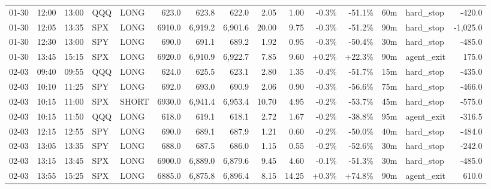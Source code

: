 \documentclass[11pt,a4paper,twoside]{article}
\begin{document}
\begin{landscape}
\begin{center}
\begin{longtable}{>{\color{txtmain}}l l l l l r r r r r r r r >{\color{txtmain}}l r}
01-30 & 12:00 & 13:00 & QQQ & LONG & 623.0 & 623.8 & 622.0 & 2.05 & 1.00 & \textcolor{lossred}{-0.3\%} & \textcolor{lossred}{-51.1\%} & 60m & hard\_stop & \textcolor{lossred}{-420.0} \\
01-30 & 12:05 & 13:35 & SPX & LONG & 6910.0 & 6,919.2 & 6,901.6 & 20.00 & 9.75 & \textcolor{lossred}{-0.3\%} & \textcolor{lossred}{-51.2\%} & 90m & hard\_stop & \textcolor{lossred}{-1,025.0} \\
01-30 & 12:30 & 13:00 & SPY & LONG & 690.0 & 691.1 & 689.2 & 1.92 & 0.95 & \textcolor{lossred}{-0.3\%} & \textcolor{lossred}{-50.4\%} & 30m & hard\_stop & \textcolor{lossred}{-485.0} \\
01-30 & 13:45 & 15:15 & SPX & LONG & 6920.0 & 6,910.9 & 6,922.7 & 7.85 & 9.60 & \textcolor{wingreen}{+0.2\%} & \textcolor{wingreen}{+22.3\%} & 90m & agent\_exit & \textcolor{wingreen}{175.0} \\
02-03 & 09:40 & 09:55 & QQQ & LONG & 624.0 & 625.5 & 623.1 & 2.80 & 1.35 & \textcolor{lossred}{-0.4\%} & \textcolor{lossred}{-51.7\%} & 15m & hard\_stop & \textcolor{lossred}{-435.0} \\
02-03 & 10:10 & 11:25 & SPY & LONG & 692.0 & 693.0 & 690.9 & 2.06 & 0.90 & \textcolor{lossred}{-0.3\%} & \textcolor{lossred}{-56.6\%} & 75m & hard\_stop & \textcolor{lossred}{-466.0} \\
02-03 & 10:15 & 11:00 & SPX & SHORT & 6930.0 & 6,941.4 & 6,953.4 & 10.70 & 4.95 & \textcolor{lossred}{-0.2\%} & \textcolor{lossred}{-53.7\%} & 45m & hard\_stop & \textcolor{lossred}{-575.0} \\
02-03 & 10:15 & 11:50 & QQQ & LONG & 618.0 & 619.1 & 618.1 & 2.72 & 1.67 & \textcolor{lossred}{-0.2\%} & \textcolor{lossred}{-38.8\%} & 95m & agent\_exit & \textcolor{lossred}{-316.5} \\
02-03 & 12:15 & 12:55 & SPY & LONG & 690.0 & 689.1 & 687.9 & 1.21 & 0.60 & \textcolor{lossred}{-0.2\%} & \textcolor{lossred}{-50.0\%} & 40m & hard\_stop & \textcolor{lossred}{-484.0} \\
02-03 & 13:05 & 13:35 & SPY & LONG & 688.0 & 687.5 & 686.0 & 1.15 & 0.55 & \textcolor{lossred}{-0.2\%} & \textcolor{lossred}{-52.6\%} & 30m & hard\_stop & \textcolor{lossred}{-242.0} \\
02-03 & 13:15 & 13:45 & SPX & LONG & 6900.0 & 6,889.0 & 6,879.6 & 9.45 & 4.60 & \textcolor{lossred}{-0.1\%} & \textcolor{lossred}{-51.3\%} & 30m & hard\_stop & \textcolor{lossred}{-485.0} \\
02-03 & 13:55 & 15:25 & SPX & LONG & 6885.0 & 6,875.8 & 6,896.4 & 8.15 & 14.25 & \textcolor{wingreen}{+0.3\%} & \textcolor{wingreen}{+74.8\%} & 90m & agent\_exit & \textcolor{wingreen}{610.0} \\

\end{longtable}
\end{center}
\end{landscape}
\end{document}
